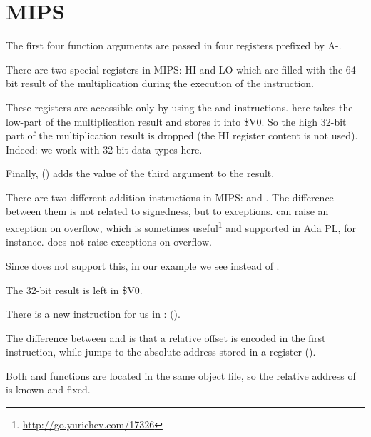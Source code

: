 \section{MIPS}



The first four function arguments are passed in four registers prefixed by A-.


There are two special registers in MIPS: HI and LO which are filled with the 64-bit result of the multiplication during the execution of the  instruction.

These registers are accessible only by using the  and  instructions.
 here takes the low-part of the multiplication result and stores it into \$V0.
So the high 32-bit part of the multiplication result is dropped (the HI register content is not used).
Indeed: we work with 32-bit \Tint data types here.


Finally,  () adds the value of the third argument to the result.


There are two different addition instructions in MIPS:  and .
The difference between them is not related to signedness, but to exceptions.  can raise an exception on overflow, which is sometimes useful\footnote{\url{http://go.yurichev.com/17326}} and supported in Ada \ac{PL}, for instance.
 does not raise exceptions on overflow.

Since \CCpp does not support this, in our example we see  instead of .

The 32-bit result is left in \$V0.


There is a new instruction for us in \main:  (). 

The difference between  and  is that a relative offset is encoded in the first instruction, 
while  jumps to the absolute address stored in a register ().

Both \ttf and \main functions are located in the same object file, so the relative address of \ttf 
is known and fixed.
